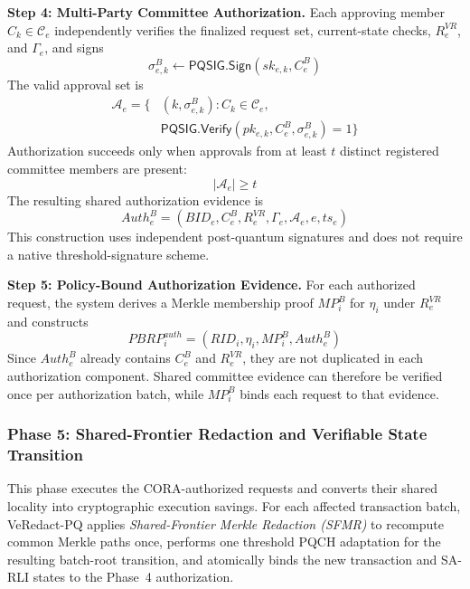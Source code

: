 \documentclass[lettersize,journal]{IEEEtran}
\begin{document}
\medskip
\noindent\textbf{Step 4: Multi-Party Committee Authorization.}
Each approving member $C_k\in\mathcal{C}_e$ independently verifies the
finalized request set, current-state checks, $R_e^{VR}$, and
$\Gamma_e$, and signs
\begin{equation}
\sigma_{e,k}^{B}
\leftarrow
\mathsf{PQSIG.Sign}
\left(
sk_{e,k},C_e^{B}
\right)
\end{equation}
The valid approval set is
\begin{equation}
\begin{aligned}
\mathcal{A}_e=\big\{&
(k,\sigma_{e,k}^{B}):
C_k\in\mathcal{C}_e,\\
&
\mathsf{PQSIG.Verify}
(pk_{e,k},C_e^{B},\sigma_{e,k}^{B})=1
\big\}
\end{aligned}
\end{equation}
Authorization succeeds only when approvals from at least $t$ distinct
registered committee members are present:
\begin{equation}
|\mathcal{A}_e|\geq t
\end{equation}
The resulting shared authorization evidence is
\begin{equation}
Auth_e^{B}
=
(BID_e,C_e^{B},R_e^{VR},\Gamma_e,
\mathcal{A}_e,e,ts_e)
\end{equation}
This construction uses independent post-quantum signatures and does not
require a native threshold-signature scheme.

\medskip
\noindent\textbf{Step 5: Policy-Bound Authorization Evidence.}
For each authorized request, the system derives a Merkle membership
proof $MP_i^{B}$ for $\eta_i$ under $R_e^{VR}$ and constructs
\begin{equation}
PBRP_i^{auth}
=
(RID_i,\eta_i,MP_i^{B},Auth_e^{B})
\end{equation}
Since $Auth_e^{B}$ already contains $C_e^{B}$ and $R_e^{VR}$, they are
not duplicated in each authorization component. Shared committee
evidence can therefore be verified once per authorization batch, while
$MP_i^{B}$ binds each request to that evidence.    
 \subsubsection*{\textbf{Phase 5: Shared-Frontier Redaction and
Verifiable State Transition}}

This phase executes the CORA-authorized requests and converts their
shared locality into cryptographic execution savings. For each affected
transaction batch, VeRedact-PQ applies \emph{Shared-Frontier Merkle
Redaction (SFMR)} to recompute common Merkle paths once, performs one
threshold PQCH adaptation for the resulting batch-root transition, and
atomically binds the new transaction and SA-RLI states to the Phase~4
authorization.
\end{document}
